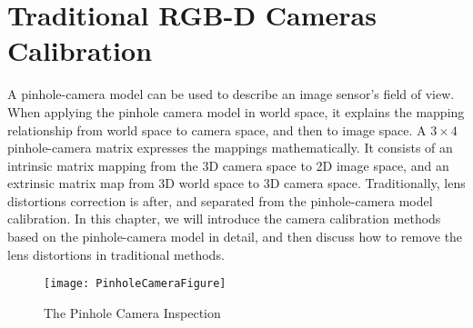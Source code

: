 \chapter{Traditional RGB-D Cameras Calibration} %
\label{chapterTraditionalCalibration} %
A pinhole-camera model can be used to describe an image sensor's field of view. When applying the pinhole camera model in world space, it explains the mapping relationship from world space to camera space, and then to image space. A $3\times4$ pinhole-camera matrix expresses the mappings mathematically. It consists of an intrinsic matrix mapping from the 3D camera space to 2D image space, and an extrinsic matrix map from 3D world space to 3D camera space. Traditionally, lens distortions correction is after, and separated from the pinhole-camera model calibration. In this chapter, we will introduce the camera calibration methods based on the pinhole-camera model in detail, and then discuss how to remove the lens distortions in traditional methods.
%
\begin{figure}[!b]
\centering
\texttt{[image: PinholeCameraFigure]}
\caption{The Pinhole Camera Inspection}
\label{PinholeCameraFigure}
\end{figure}%
